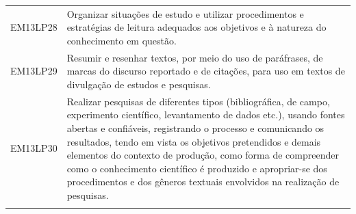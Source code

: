 \documentclass[12pt]{extarticle}
\begin{document}
\begin{longtable}{ll}
EM13LP28   & Organizar situações de estudo e utilizar procedimentos e estratégias de leitura adequados aos objetivos e à natureza do conhecimento em questão.                                                                                                                                                                                                                                                                                                                                                                                                                                                                                                                                                                                                                                                                      \\
\rowcolor[HTML]{E0F7FA} 
EM13LP29   & Resumir e resenhar textos, por meio do uso de paráfrases, de marcas do discurso reportado e de citações, para uso em textos de divulgação de estudos e pesquisas.                                                                                                                                                                                                                                                                                                                                                                                                                                                                                                                                                                                                                                                     \\
\rowcolor[HTML]{FFF} 
EM13LP30   & Realizar pesquisas de diferentes tipos (bibliográfica, de campo, experimento científico, levantamento de dados etc.), usando fontes abertas e confiáveis, registrando o processo e comunicando os resultados, tendo em vista os objetivos pretendidos e demais elementos do contexto de produção, como forma de compreender como o conhecimento científico é produzido e apropriar-se dos procedimentos e dos gêneros textuais envolvidos na realização de pesquisas.                                                                                                                                                                                                                                                                                                                                                 \\
\rowcolor[HTML]{E0F7FA} 

\end{longtable}
\end{document}
